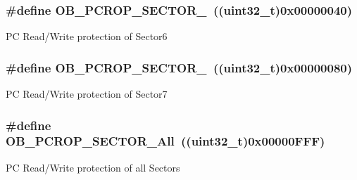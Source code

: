\subsubsection[{\texorpdfstring{O\+B\+\_\+\+P\+C\+R\+O\+P\+\_\+\+S\+E\+C\+T\+O\+R\+\_\+6}{OB_PCROP_SECTOR_6}}]{\setlength{\rightskip}{0pt plus 5cm}\#define O\+B\+\_\+\+P\+C\+R\+O\+P\+\_\+\+S\+E\+C\+T\+O\+R\+\_~((uint32\+\_\+t)0x00000040)}\hypertarget{group___f_l_a_s_h_ex___option___bytes___p_c___read_write___protection_ga10d6b7983ed196511c8150c12965b407}{}\label{group___f_l_a_s_h_ex___option___bytes___p_c___read_write___protection_ga10d6b7983ed196511c8150c12965b407}
PC Read/\+Write protection of Sector6 
\subsubsection[{\texorpdfstring{O\+B\+\_\+\+P\+C\+R\+O\+P\+\_\+\+S\+E\+C\+T\+O\+R\+\_\+7}{OB_PCROP_SECTOR_7}}]{\setlength{\rightskip}{0pt plus 5cm}\#define O\+B\+\_\+\+P\+C\+R\+O\+P\+\_\+\+S\+E\+C\+T\+O\+R\+\_~((uint32\+\_\+t)0x00000080)}\hypertarget{group___f_l_a_s_h_ex___option___bytes___p_c___read_write___protection_ga7d74caf6e88d230f4dcdcbf9ab6d7e1e}{}\label{group___f_l_a_s_h_ex___option___bytes___p_c___read_write___protection_ga7d74caf6e88d230f4dcdcbf9ab6d7e1e}
PC Read/\+Write protection of Sector7 
\subsubsection[{\texorpdfstring{O\+B\+\_\+\+P\+C\+R\+O\+P\+\_\+\+S\+E\+C\+T\+O\+R\+\_\+\+All}{OB_PCROP_SECTOR_All}}]{\setlength{\rightskip}{0pt plus 5cm}\#define O\+B\+\_\+\+P\+C\+R\+O\+P\+\_\+\+S\+E\+C\+T\+O\+R\+\_\+\+All~((uint32\+\_\+t)0x00000\+F\+F\+F)}\hypertarget{group___f_l_a_s_h_ex___option___bytes___p_c___read_write___protection_gab0ae871624f4cdff9b41b3fea88a5698}{}\label{group___f_l_a_s_h_ex___option___bytes___p_c___read_write___protection_gab0ae871624f4cdff9b41b3fea88a5698}
PC Read/\+Write protection of all Sectors 